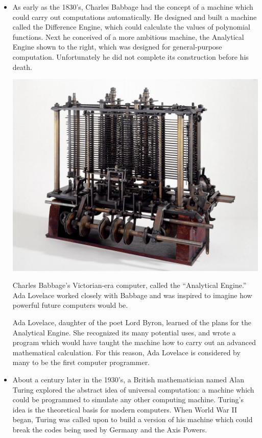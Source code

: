 \begin{itemize}
\item As early as the 1830's, Charles Babbage had the concept of a machine which could carry out computations automatically. He designed and built a machine called the Difference Engine, which could calculate the values of polynomial functions. Next he conceived of a more ambitious machine, the Analytical Engine shown to the right, which was designed for general-purpose computation. Unfortunately he did not complete its construction before his death.
\begin{marginfigure}
	\centering
	\includegraphics[width=\textwidth]{images/analytic_engine.jpg}
	\caption{Charles Babbage's Victorian-era computer, called the ``Analytical Engine.'' Ada Lovelace worked closely with Babbage and was inspired to imagine how powerful future computers would be.}
	\label{fig:analytic_engine}
\end{marginfigure}
Ada Lovelace, daughter of the poet Lord Byron, learned of the plans for the Analytical Engine. She recognized its many potential uses, and wrote a program which would have taught the machine how to carry out an advanced mathematical calculation. For this reason, Ada Lovelace is considered by many to be the first computer programmer.
\item About a century later in the 1930's, a British mathematician named Alan Turing explored the abstract idea of universal computation: a machine which could be programmed to simulate any other computing machine. Turing's idea is the theoretical basis for modern computers. When World War II began, Turing was called upon to build a version of his machine which could break the codes being used by Germany and the Axis Powers. 

\end{itemize}
